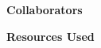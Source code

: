\documentclass[12pt,letterpaper]{article}
\begin{document}
\textbf{Collaborators}

\textbf{Resources Used}

\noindent\makebox[\linewidth]{\rule{\linewidth}{0.4pt}}

\newpage


\end{document}
